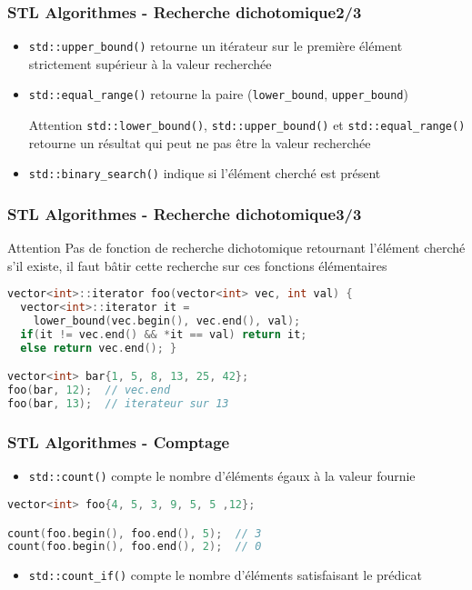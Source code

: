 \documentclass[C++.tex]{subfiles}
\begin{document}
\begin{frame}[fragile]
	\frametitle{STL Algorithmes - Recherche dichotomique\titlehfill{}2/3}
	\begin{itemize}
		\item \lstinline|std::upper_bound()| retourne un itérateur sur le première élément strictement supérieur à la valeur recherchée 
		\item \lstinline|std::equal_range()| retourne la paire (\lstinline|lower_bound|, \lstinline|upper_bound|)

		\begin{alertblock}{Attention}
			\lstinline|std::lower_bound()|, \lstinline|std::upper_bound()| et \lstinline|std::equal_range()| retourne un résultat qui peut ne pas être la valeur recherchée
		\end{alertblock}

		\item \lstinline|std::binary_search()| indique si l'élément cherché est présent
	\end{itemize}
\end{frame}

\begin{frame}[fragile]
	\frametitle{STL Algorithmes - Recherche dichotomique\titlehfill{}3/3}
	\begin{alertblock}{Attention}
		Pas de fonction de recherche dichotomique retournant l'élément cherché s'il existe, il faut bâtir cette recherche sur ces fonctions élémentaires
	\end{alertblock}

	\begin{lstlisting}[language=C++]
vector<int>::iterator foo(vector<int> vec, int val) {
  vector<int>::iterator it = 
    lower_bound(vec.begin(), vec.end(), val);
  if(it != vec.end() && *it == val) return it;
  else return vec.end(); }

vector<int> bar{1, 5, 8, 13, 25, 42};
foo(bar, 12);  // vec.end
foo(bar, 13);  // iterateur sur 13
\end{lstlisting}
\end{frame}

\begin{frame}[fragile]
	\frametitle{STL Algorithmes - Comptage}
	\begin{itemize}
		\item \lstinline|std::count()| compte le nombre d'éléments égaux à la valeur fournie
	\end{itemize}

	\begin{lstlisting}[language=C++]
vector<int> foo{4, 5, 3, 9, 5, 5 ,12};

count(foo.begin(), foo.end(), 5);  // 3
count(foo.begin(), foo.end(), 2);  // 0\end{lstlisting}

	\begin{itemize}
		\item \lstinline|std::count_if()| compte le nombre d'éléments satisfaisant le prédicat
	\end{itemize}
\end{frame}
\end{document}
